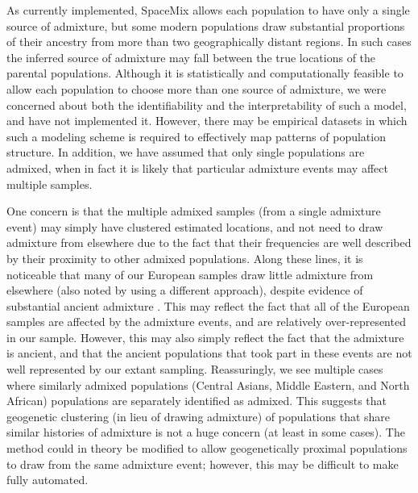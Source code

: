 \documentclass[10pt,letterpaper]{article}
\begin{document}
As currently implemented, SpaceMix allows each population to have only a single source of admixture, 
but some modern populations draw substantial proportions of their ancestry from more than two geographically distant regions.
In such cases the inferred source of admixture may fall between the true locations of the parental populations.  
Although it is statistically and computationally feasible to allow each population to choose more than one source of admixture, 
we were concerned about both the identifiability and the interpretability of such a model, and have not implemented it.
However, there may be empirical datasets in which such a modeling scheme is required to effectively map patterns of population structure.
In addition, we have assumed that only single populations are admixed, when in fact it is likely that particular admixture events may affect multiple samples.

One concern is that the multiple admixed samples (from a single admixture event) may simply have clustered estimated locations, 
and not need to draw admixture from elsewhere due to the fact that their frequencies are well described by their proximity to other admixed populations.  
Along these lines, it is noticeable that many of our European samples draw little admixture from elsewhere (also noted by \cite{Hellenthal} using a different approach), 
despite evidence of substantial ancient admixture \cite{lazaridis_ancient_2014}.
This may reflect the fact that all of the European samples are affected by the admixture events, and are relatively over-represented in our sample. 
However, this may also simply reflect the fact that the admixture is ancient, 
and that the ancient populations that took part in these events are not well represented by our extant sampling. 
Reassuringly, we see multiple cases where similarly admixed populations (Central Asians, Middle Eastern, and North African) 
populations are separately identified as admixed. 
This suggests that geogenetic clustering (in lieu of drawing admixture) of populations that share similar histories of admixture is not a huge concern 
(at least in some cases). 
The method could in theory be modified to allow geogenetically proximal populations to draw from the same admixture event;
however, this may be difficult to make fully automated.
\end{document}
